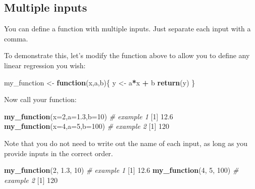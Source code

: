 \documentclass[
]{book}
\newenvironment{Shaded}{\begin{snugshade}}{\end{snugshade}}
\newcommand{\CommentTok}[1]{\textcolor[rgb]{0.56,0.35,0.01}{\textit{#1}}}
\newcommand{\ControlFlowTok}[1]{\textcolor[rgb]{0.13,0.29,0.53}{\textbf{#1}}}
\newcommand{\DataTypeTok}[1]{\textcolor[rgb]{0.13,0.29,0.53}{#1}}
\newcommand{\DecValTok}[1]{\textcolor[rgb]{0.00,0.00,0.81}{#1}}
\newcommand{\FloatTok}[1]{\textcolor[rgb]{0.00,0.00,0.81}{#1}}
\newcommand{\KeywordTok}[1]{\textcolor[rgb]{0.13,0.29,0.53}{\textbf{#1}}}
\newcommand{\NormalTok}[1]{#1}
\newcommand{\OperatorTok}[1]{\textcolor[rgb]{0.81,0.36,0.00}{\textbf{#1}}}
\newcommand{\StringTok}[1]{\textcolor[rgb]{0.31,0.60,0.02}{#1}}
\begin{document}
\hypertarget{multiple-inputs}{%
\subsection*{Multiple inputs}\label{multiple-inputs}}

You can define a function with multiple inputs. Just separate each input with a comma.

To demonstrate this, let's modify the function above to allow you to define any linear regression you wish:

\begin{Shaded}
\begin{Highlighting}[]
\NormalTok{my_function <-}\StringTok{ }\ControlFlowTok{function}\NormalTok{(x,a,b)\{}
\NormalTok{  y <-}\StringTok{ }\NormalTok{a}\OperatorTok{*}\NormalTok{x }\OperatorTok{+}\StringTok{ }\NormalTok{b}
  \KeywordTok{return}\NormalTok{(y)}
\NormalTok{\}}
\end{Highlighting}
\end{Shaded}

Now call your function:

\begin{Shaded}
\begin{Highlighting}[]
\KeywordTok{my_function}\NormalTok{(}\DataTypeTok{x=}\DecValTok{2}\NormalTok{,}\DataTypeTok{a=}\FloatTok{1.3}\NormalTok{,}\DataTypeTok{b=}\DecValTok{10}\NormalTok{) }\CommentTok{# example 1}
\NormalTok{[}\DecValTok{1}\NormalTok{] }\FloatTok{12.6}
\KeywordTok{my_function}\NormalTok{(}\DataTypeTok{x=}\DecValTok{4}\NormalTok{,}\DataTypeTok{a=}\DecValTok{5}\NormalTok{,}\DataTypeTok{b=}\DecValTok{100}\NormalTok{) }\CommentTok{# example 2}
\NormalTok{[}\DecValTok{1}\NormalTok{] }\DecValTok{120}
\end{Highlighting}
\end{Shaded}

Note that you do not need to write out the name of each input, as long as you provide inputs in the correct order.

\begin{Shaded}
\begin{Highlighting}[]
\KeywordTok{my_function}\NormalTok{(}\DecValTok{2}\NormalTok{, }\FloatTok{1.3}\NormalTok{, }\DecValTok{10}\NormalTok{) }\CommentTok{# example 1}
\NormalTok{[}\DecValTok{1}\NormalTok{] }\FloatTok{12.6}
\KeywordTok{my_function}\NormalTok{(}\DecValTok{4}\NormalTok{, }\DecValTok{5}\NormalTok{, }\DecValTok{100}\NormalTok{) }\CommentTok{# example 2}
\NormalTok{[}\DecValTok{1}\NormalTok{] }\DecValTok{120}
\end{Highlighting}
\end{Shaded}
\end{document}
